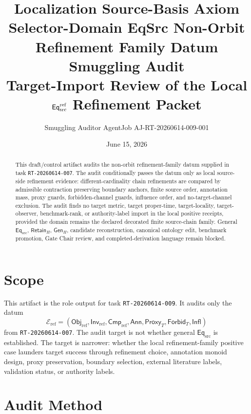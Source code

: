 \documentclass[11pt]{article}
\title{\textbf{Localization Source-Basis Axiom Selector-Domain EqSrc Non-Orbit Refinement Family Datum Smuggling Audit}\\[0.35em]
\large Target-Import Review of the Local \(\mathsf{Eq}_{\mathrm{src}}^{\mathrm{ref}}\) Refinement Packet}
\author{Smuggling Auditor AgentJob AJ-RT-20260614-009-001}
\date{June 15, 2026}
\newcommand{\EqSrc}{\mathsf{Eq}_{\mathrm{src}}}
\newcommand{\ObjRef}{\mathsf{Obj}_{\mathrm{ref}}}
\newcommand{\InvRef}{\mathsf{Inv}_{\mathrm{ref}}}
\newcommand{\CmpRef}{\mathsf{Cmp}_{\mathrm{ref}}}
\newcommand{\Ann}{\mathsf{Ann}}
\newcommand{\Proxy}{\mathsf{Proxy}_{T}}
\newcommand{\Forbid}{\mathsf{Forbid}_{T}}
\newcommand{\Infl}{\mathsf{Infl}}
\newcommand{\RetainH}{\mathsf{Retain}_{H}}
\newcommand{\GenH}{\mathsf{Gen}_{H}}
\begin{document}
\maketitle

\begin{abstract}
This draft/control artifact audits the non-orbit refinement-family datum
supplied in task \texttt{RT-20260614-007}. The audit conditionally passes
the datum only as local source-side refinement evidence:
different-cardinality chain refinements are compared by admissible
contraction preserving boundary anchors, finite source order, annotation
mass, proxy guards, forbidden-channel guards, influence order, and
no-target-channel exclusion. The audit finds no target metric, target
proper-time, target-locality, target-observer, benchmark-rank, or
authority-label import in the local positive receipts, provided the
domain remains the declared decorated finite source-chain family. General
\(\EqSrc\), \(\RetainH\), \(\GenH\), candidate reconstruction, canonical
ontology edit, benchmark promotion, Gate Chair review, and
completed-derivation language remain blocked.
\end{abstract}

\section{Scope}

This artifact is the role output for task \texttt{RT-20260614-009}. It
audits only the datum
\[
    \mathcal{E}_{\mathrm{ref}}=
    (\ObjRef,\InvRef,\CmpRef,\Ann,\Proxy,\Forbid,\Infl)
\]
from \texttt{RT-20260614-007}. The audit target is not whether general
\(\EqSrc\) is established. The target is narrower: whether the local
refinement-family positive case launders target success through
refinement choice, annotation monoid design, proxy preservation, boundary
selection, external literature labels, validation status, or authority
labels.

\section{Audit Method}
\end{document}
